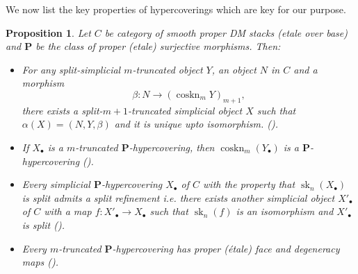 \documentclass[a4paper]{amsart}
\newtheorem{proposition}[theorem]{Proposition}
\theoremstyle{definition}
\begin{document}
We now list the key properties of hypercoverings which are key for our purpose.
\begin{proposition}\label{propertyofPhypercoverings}
Let $C$ be category of smooth proper DM stacks (etale over base) and $\mathbf{P}$ be the class of proper (etale) surjective morphisms. Then:
    \begin{itemize}
    \item For any split-simplicial $m$-truncated object $Y$, an object $N$ in $C$ and a morphism 
    \begin{equation}
        \beta : N \to (\operatorname{coskn}_m Y)_{m+1},
    \end{equation}
    there exists a split-$m+1$-truncated simplicial object $X$ such that $\alpha(X)=(N,Y,\beta)$ and it is unique upto isomorphism. (\cite[Theorem 4.12]{conradcohmdescent}).        
    \item If $X_{\bullet}$ is a $m$-truncated $\mathbf{P}$-hypercovering, then $\operatorname{coskn}_m(Y_{\bullet})$ is a $\mathbf{P}$-hypercovering (\cite[Example 4.5]{conradcohmdescent}).
        \item Every simplicial $\mathbf{P}$-hypercovering $X_{\bullet}$ of $C$  with the property that $\operatorname{sk}_n(X_{\bullet})$ is split admits a split refinement i.e. there exists another simplicial object $X'_{\bullet}$ of $C$ with a map $f:X'_{\bullet} \to X_{\bullet}$ such that $\operatorname{sk}_n(f)$ is an isomorphism and $X'_{\bullet}$ is split (\cite[Thoerem 4.13]{conradcohmdescent}).
\item Every $m$-truncated $\mathbf{P}$-hypercovering has proper (\'etale) face and degeneracy maps (\cite[Corollary 4.14]{conradcohmdescent}).
 
         \end{itemize}
\end{proposition}




\end{document}
